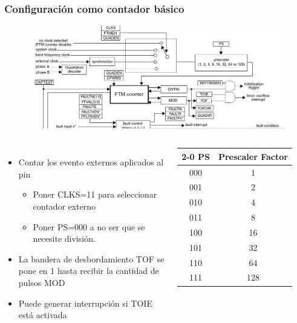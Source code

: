\documentclass[10.5pt,scale=1.0,t,aspectratio=169,hyperref={pdfpagelabels=false}]{beamer}
\begin{document}
\begin{frame}
	\frametitle{Configuración como contador básico}
	\vspace{-0.3cm}
	{\footnotesize
		\begin{figure}
			\centering
			\includegraphics[scale=0.4]{06_TimerConfig}
		\end{figure}
		
		\begin{columns}
			\begin{itemize}
				\item Contar los evento externos aplicados al pin
				\begin{itemize}
					\item Poner CLKS=11 para seleccionar contador externo
					\item Poner PS=000 a no ser que se necesite división. 
				\end{itemize}
				\item La bandera de desbordamiento TOF se pone en 1 hasta recibir la cantidad de pulsos MOD
				\item Puede generar interrupción si TOIE está activada
			\end{itemize}
			
			\begin{table}[h]
				\begin{tabular}{cc}
				\hline
				\textbf{2-0 PS}	& \textbf{Prescaler Factor}  \\
				\hline
				000	& 1   \\
				001	& 2   \\
				010	& 4 \\
				011	& 8 \\
				100	& 16 \\
				101	& 32 \\
				110	& 64 \\
				111	& 128 \\
				\hline
				\end{tabular}
			\end{table}
		\end{columns}
	}
\end{frame}
\end{document}

